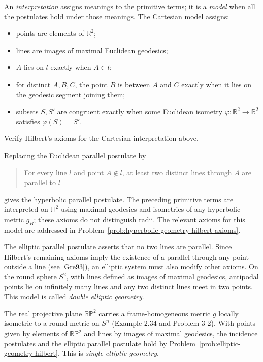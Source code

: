 An \emph{interpretation} assigns meanings to the primitive terms; it is a
\emph{model} when all the postulates hold under those meanings. The Cartesian
model assigns:
\begin{itemize}
\item points are elements of $\mathbb R^2$;
\item lines are images of maximal Euclidean geodesics;
\item $A$ lies on $l$ exactly when $A\in l$;
\item for distinct $A,B,C$, the point $B$ is between $A$ and $C$ exactly when
it lies on the geodesic segment joining them;
\item subsets $S,S'$ are congruent exactly when some Euclidean isometry
$\varphi\colon\mathbb R^2\to\mathbb R^2$ satisfies $\varphi(S)=S'$.
\end{itemize}

\begin{exercise}
\label{exer:hilbert-axioms-euclidean-plane}
Verify Hilbert's axioms for the Cartesian interpretation above.
\end{exercise}

Replacing the Euclidean parallel postulate by
\begin{quote}
For every line $l$ and point $A\notin l$, at least two distinct lines through
$A$ are parallel to $l$
\end{quote}
gives the hyperbolic parallel postulate. The preceding primitive terms are
interpreted on $\mathbb H^2$ using maximal geodesics and isometries of any
hyperbolic metric $g_B$; these axioms do not distinguish radii. The relevant
axioms for this model are addressed in
Problem~\ref{prob:hyperbolic-geometry-hilbert-axioms}.

The elliptic parallel postulate asserts that no two lines are parallel. Since
Hilbert's remaining axioms imply the existence of a parallel through any point
outside a line (see [Gre93]), an elliptic system must also modify other axioms.
On the round sphere $S^2$, with lines defined as images of maximal geodesics,
antipodal points lie on infinitely many lines and any two distinct lines meet
in two points. This model is called \emph{double elliptic geometry}.

\begin{example}
\label{ex:real-projective-plane-elliptic-geometry}
The real projective plane $\mathbb{RP}^2$ carries a frame-homogeneous metric
$g$ locally isometric to a round metric on $S^n$ (Example 2.34 and
Problem 3-2). With points given by elements of $\mathbb{RP}^2$ and lines by
images of maximal geodesics, the incidence postulates and the elliptic parallel
postulate hold by Problem~\ref{prob:elliptic-geometry-hilbert}. This is
\emph{single elliptic geometry}.
\end{example}
